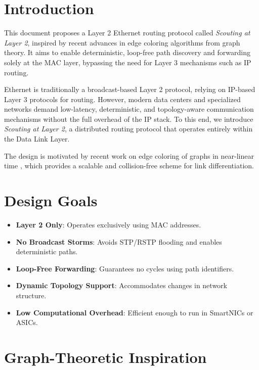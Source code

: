 \documentclass[../../../OAE-SPEC-MAIN.tex]{subfiles}
\begin{document}
\section{Introduction}

This document proposes a Layer 2 Ethernet routing protocol called \emph{Scouting at Layer 2}, inspired by recent advances in edge coloring algorithms from graph theory. It aims to enable deterministic, loop-free path discovery and forwarding solely at the MAC layer, bypassing the need for Layer 3 mechanisms such as IP routing.

Ethernet is traditionally a broadcast-based Layer 2 protocol, relying on IP-based Layer 3 protocols for routing. However, modern data centers and specialized networks demand low-latency, deterministic, and topology-aware communication mechanisms without the full overhead of the IP stack. To this end, we introduce \emph{Scouting at Layer 2}, a distributed routing protocol that operates entirely within the Data Link Layer.

The design is motivated by recent work on edge coloring of graphs in near-linear time \cite{li2024vizing}, which provides a scalable and collision-free scheme for link differentiation.

\section{Design Goals}

\begin{itemize}[label=--]
    \item \textbf{Layer 2 Only}: Operates exclusively using MAC addresses.
    \item \textbf{No Broadcast Storms}: Avoids STP/RSTP flooding and enables deterministic paths.
    \item \textbf{Loop-Free Forwarding}: Guarantees no cycles using path identifiers.
    \item \textbf{Dynamic Topology Support}: Accommodates changes in network structure.
    \item \textbf{Low Computational Overhead}: Efficient enough to run in SmartNICs or ASICs.
\end{itemize}

\section{Graph-Theoretic Inspiration}
\end{document}
